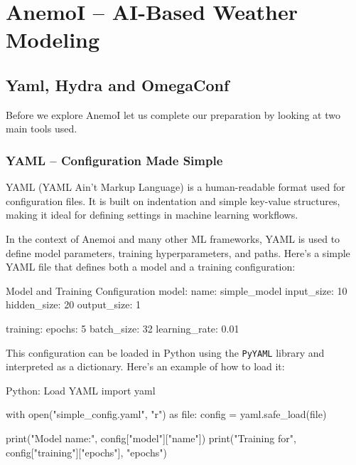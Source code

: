 \chapter{AnemoI – AI-Based Weather Modeling}

%
\section{Yaml, Hydra and OmegaConf}

Before we explore AnemoI let us complete our preparation by looking at two main tools used. 

%
\subsection{YAML – Configuration Made Simple}

YAML (YAML Ain't Markup Language) is a human-readable format used for configuration files. It is built on indentation and simple key-value structures, making it ideal for defining settings in machine learning workflows.

In the context of Anemoi and many other ML frameworks, YAML is used to define model parameters, training hyperparameters, and paths. Here's a simple YAML file that defines both a model and a training configuration:

\begin{codeonly}{Model and Training Configuration}
model:
  name: simple_model
  input_size: 10
  hidden_size: 20
  output_size: 1

training:
  epochs: 5
  batch_size: 32
  learning_rate: 0.01
\end{codeonly}

This configuration can be loaded in Python using the \texttt{PyYAML} library and interpreted as a dictionary. Here's an example of how to load it:

\begin{codeonly}{Python: Load YAML}
import yaml

with open("simple_config.yaml", "r") as file:
    config = yaml.safe_load(file)

print("Model name:", config["model"]["name"])
print("Training for", config["training"]["epochs"], "epochs")
\end{codeonly}

